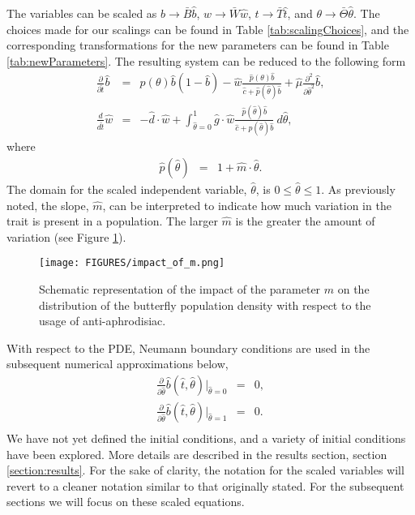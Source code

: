\documentclass[review,authoryear]{elsarticle}
\newcommand{\origB}{{b}}
\newcommand{\origW}{{w}}
\newcommand{\origTheta}{{\theta}}
\newcommand{\origT}{{t}}
\newcommand{\scaledB}{\hat{b}}
\newcommand{\scaledW}{\hat{w}}
\newcommand{\scaledC}{\hat{c}}
\newcommand{\scaledD}{\hat{d}}
\newcommand{\scaledG}{\hat{g}}
\newcommand{\scaledP}[1]{\hat{p}(#1)}
\newcommand{\scaledTheta}{\hat{\theta}}
\newcommand{\scaledT}{\hat{t}}
\newcommand{\scaledMu}{\hat{\mu}}
\newcommand{\scaledM}{\hat{m}}
\begin{document}
The variables can be scaled as $\origB\rightarrow \bar{B}\scaledB$,
$\origW\rightarrow \bar{W}\scaledW$, $\origT\rightarrow \bar{T}\scaledT$, and
$\origTheta\rightarrow \bar{\Theta}\scaledTheta$. The choices made for our
scalings can be found in Table \ref{tab:scalingChoices}, and the
corresponding transformations for the new parameters can be found in
Table \ref{tab:newParameters}.  The resulting system can be reduced to
the following form
\begin{eqnarray}
  \label{eq:scaledodePDE1}
  \frac{\partial}{\partial \scaledT} \scaledB & = &
      p(\theta) \scaledB (1 - \scaledB)
      -  \scaledW \frac{\scaledP{\theta} \scaledB}{\scaledC+\scaledP{\scaledTheta}\scaledB}
      + \scaledMu \frac{\partial^2}{\partial \scaledTheta^2} \scaledB , \\
  \label{eq:scaledodePDE2}
  \frac{d}{d\scaledT} \scaledW & = & -\scaledD \cdot \scaledW +
      \int^1_{\scaledTheta=0} \scaledG \cdot \scaledW \frac{\scaledP{\scaledTheta} \scaledB }{\scaledC + \scaledP{\scaledTheta} \scaledB} ~ d\scaledTheta,
\end{eqnarray}
where
\begin{eqnarray}
    \label{eq:definitionP}
  \scaledP{\scaledTheta} & = & 1 + \scaledM \cdot \scaledTheta.
\end{eqnarray}
The domain for the scaled independent variable, $\scaledTheta$, is
$0\leq\scaledTheta\leq 1$. As previously noted, the slope, $\scaledM$, can be
interpreted to indicate how much variation in the trait is present in
a population. The larger $\scaledM$ is the greater the amount of variation (see Figure \ref{fig:impact_of_m}).
\begin{figure}[htb]
  \centering
  \texttt{[image: FIGURES/impact\_of\_m.png]}
  \caption[Schematic representation of the impact of the parameter $m$.]{Schematic representation of the impact of the parameter $m$ on the distribution of the butterfly population density with respect to the usage of anti-aphrodisiac.}
  \label{fig:impact_of_m}
\end{figure}
With respect to the PDE, Neumann boundary conditions are used in the
subsequent numerical approximations below,
\begin{eqnarray*}
  \frac{\partial}{\partial\scaledTheta} \scaledB(\scaledT,\scaledTheta) \bigg|_{\scaledTheta=0} & = & 0, \\
  \frac{\partial}{\partial\scaledTheta} \scaledB(\scaledT,\scaledTheta) \bigg|_{\scaledTheta=1} & = & 0. \\
\end{eqnarray*}
We have not yet defined the initial conditions, and
a variety of initial
conditions have been explored. More details are  described in the results
section, section \ref{section:results}. For the sake of clarity, the notation for the scaled variables will revert to a cleaner notation similar to that originally stated. For the subsequent sections we will focus on these scaled equations.
\end{document}
